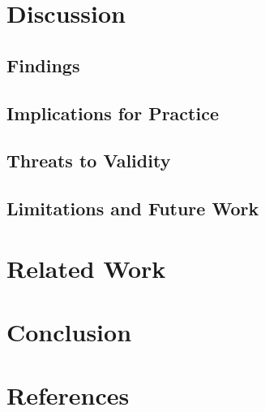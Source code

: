 \documentclass[review]{elsarticle}
\begin{document}
\section{Discussion}\label{sec:discussion}


\subsection{Findings}\label{sec:findings}


\subsection{Implications for Practice}\label{sec:implications}


\subsection{Threats to Validity}\label{sec:threats}


\subsection{Limitations and Future Work}\label{sec:limitations}


\section{Related Work} \label{sec:related_works}


\section{Conclusion} \label{sec:conclusions}


\section*{References}


\end{document}
